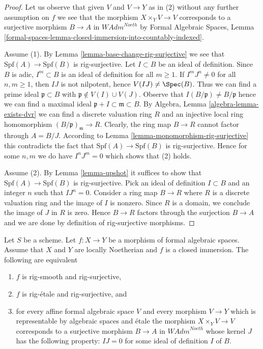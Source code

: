 \begin{proof}
Let us observe that given $V$ and $V \to Y$ as in (2) without any
further assumption on $f$ we see that the morphism $X \times_Y V \to V$
corresponds to a surjective morphism $B \to A$ in $\textit{WAdm}^{Noeth}$
by Formal Algebraic Spaces, Lemma
\ref{formal-spaces-lemma-closed-immersion-into-countably-indexed}.

\medskip\noindent
Assume (1). By Lemma \ref{lemma-base-change-rig-surjective} we see that
$\text{Spf}(A) \to \text{Spf}(B)$ is rig-surjective.
Let $I \subset B$ be an ideal of definition. Since $B$ is adic,
$I^m \subset B$ is an ideal of definition for all $m \geq 1$.
If $I^m J^n \not = 0$ for all $n, m \geq 1$, then
$IJ$ is not nilpotent, hence $V(IJ) \not = \Spec(B)$.
Thus we can find a prime ideal $\mathfrak p \subset B$
with $\mathfrak p \not \in V(I) \cup V(J)$.
Observe that $I(B/\mathfrak p) \not = B/\mathfrak p$
hence we can find a maximal ideal
$\mathfrak p + I \subset \mathfrak m \subset B$.
By Algebra, Lemma \ref{algebra-lemma-exists-dvr}
we can find a discrete valuation ring $R$
and an injective local ring homomorphism $(B/\mathfrak p)_\mathfrak m \to R$.
Clearly, the ring map $B \to R$ cannot factor through $A = B/J$.
According to Lemma \ref{lemma-monomorphism-rig-surjective}
this contradicts the fact that $\text{Spf}(A) \to \text{Spf}(B)$
is rig-surjective. Hence for some $n, m$ we do have
$I^n J^m = 0$ which shows that (2) holds.

\medskip\noindent
Assume (2). By Lemma \ref{lemma-upshot} it suffices to show
that $\text{Spf}(A) \to \text{Spf}(B)$ is rig-surjective.
Pick an ideal of definition $I \subset B$ and an integer $n$
such that $I J^n = 0$.
Consider a ring map $B \to R$ where $R$ is a discrete valuation
ring and the image of $I$ is nonzero. Since $R$ is a domain, we
conclude the image of $J$ in $R$ is zero. Hence $B \to R$
factors through the surjection $B \to A$ and we are done by
definition of rig-surjective morphisms.
\end{proof}

\begin{lemma}
\label{lemma-closed-immersion-rig-smooth-rig-surjective}
Let $S$ be a scheme. Let $f : X \to Y$ be a morphism of formal algebraic
spaces. Assume that $X$ and $Y$ are locally Noetherian and $f$ is a
closed immersion. The following are equivalent
\begin{enumerate}
\item $f$ is rig-smooth and rig-surjective,
\item $f$ is rig-\'etale and rig-surjective, and
\item for every affine formal algebraic space $V$ and every morphism
$V \to Y$ which is representable by algebraic spaces and \'etale
the morphism $X \times_Y V \to V$ corresponds to a surjective morphism
$B \to A$ in $\textit{WAdm}^{Noeth}$ whose kernel $J$ has the following
property: $IJ = 0$ for some ideal of definition $I$ of $B$.
\end{enumerate}
\end{lemma}

